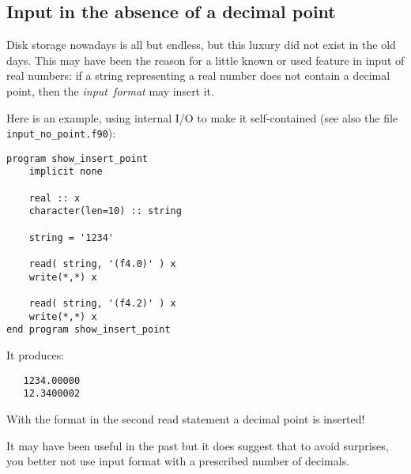 \subsection{Input in the absence of a decimal point}
Disk storage nowadays is all but endless, but this luxury did not exist in the old days.
This may have been the reason for a little known or used feature in input of real numbers:
if a string representing a real number does not contain a decimal point, then the \emph{input~format}
may insert it.

Here is an example, using internal I/O to make it self-contained (see also the file \verb+input_no_point.f90+):
\begin{verbatim}
program show_insert_point
    implicit none

    real :: x
    character(len=10) :: string

    string = '1234'

    read( string, '(f4.0)' ) x
    write(*,*) x

    read( string, '(f4.2)' ) x
    write(*,*) x
end program show_insert_point
\end{verbatim}
It produces:
\begin{verbatim}
   1234.00000
   12.3400002
\end{verbatim}
With the format in the second read statement a decimal point is inserted!

It may have been useful in the past but it does suggest that to avoid surprises, you better not
use input format with a prescribed number of decimals.



